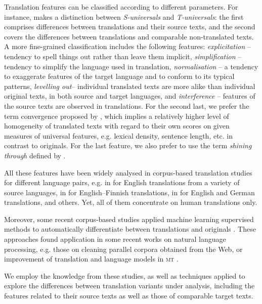 \documentclass[output=paper]{LSP/langsci}
\begin{document}
Translation features can be classified according to different parameters. For instance, \citet{Chesterman2004} makes a distinction between \textit{S-universals} and \textit{T-universals}: the ﬁrst comprises differences between translations and their source texts, and the second covers the differences between translations and comparable non-translated texts. A more ﬁne-grained classification includes the following features: \textit{explicitation} – tendency to spell things out rather than leave them implicit, \textit{simplification} – tendency to simplify the language used in translation, \textit{normalisation} – a tendency to exaggerate features of the target language and to conform to its typical patterns, \textit{levelling out}– individual translated texts are more alike than individual original texts, in both source and target languages, and \textit{interference} – features of the source texts are observed in translations. For the second last, we prefer the term convergence proposed by \citet{Laviosa2002}, which implies a relatively higher level of homogeneity of translated texts with regard to their own scores on given measures of universal features, e.g. lexical density, sentence length, etc. in contrast to originals.  For the last feature, we also prefer to use the term \textit{shining through} defined by \citet{Teich2003}.

All these features have been widely analysed in corpus-based translation studies for different language pairs, e.g. in \citet{Laviosa1996} for English translations from a variety of source languages, in \citet{Mauranen2000} for English--Finnish translations, in \citet{Teich2003} for English and German translations, and others. Yet, all of them concentrate on human translations only.

Moreover, some recent corpus-based studies applied machine learning supervised methods to automatically differentiate between translations and originals \citep[e.g.][]{Baroni2006}. These approaches found application in some recent works on natural language processing, e.g. those on cleaning parallel corpora obtained from the Web, or improvement of translation and language models in \textsc{mt}  \citep[e.g.][]{Kurokawa2009,KoppelOrdan2011,Lembersky2012}.

We employ the knowledge from these studies, as well as techniques applied to explore the differences between translation variants under analysis, including the features related to their source texts as well as those of comparable target texts.
\end{document}
